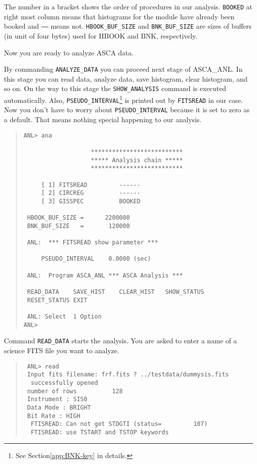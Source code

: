 The number in a bracket shows the order of procedures in our analysis.
{\tt BOOKED} at right most column means
that histograms for the module have already been booked
and {\tt ------} means not.
{\tt HBOOK\_BUF\_SIZE} and {\tt BNK\_BUF\_SIZE} are sizes of buffers
(in unit of four bytes) used for HBOOK and BNK, respectively.

Now you are ready to analyze ASCA data.

By commanding {\tt ANALYZE\_DATA}
you can proceed next stage of ASCA\_ANL.
In this stage
you can read data,
analyze data,
save histogram,
clear histogram,
and so on.
On the way to this stage
the {\tt SHOW\_ANALYSIS} command is executed automatically.
Also,
{\tt PSEUDO\_INTERVAL}\footnote{
See Section\ref{app:BNK-key} in details.
} is printed out by {\tt FITSREAD} in our case.
Now you don't have to worry about {\tt PSEUDO\_INTERVAL}
because it is set to zero as a default.
That means nothing special happening to our analysis.

\begin{quote}\baselineskip 3.2mm\begin{verbatim}
ANL> ana

                   **************************
                   ***** Analysis chain *****
                   **************************

     [ 1] FITSREAD         ------
     [ 2] CIRCREG          ------
     [ 3] GISSPEC          BOOKED

 HBOOK_BUF_SIZE =      2200000
 BNK_BUF_SIZE   =       120000

 ANL:  *** FITSREAD show parameter ***

     PSEUDO_INTERVAL    0.0000 (sec)
 
 ANL:  Program ASCA_ANL *** ASCA Analysis ***
 
 READ_DATA    SAVE_HIST    CLEAR_HIST   SHOW_STATUS 
 RESET_STATUS EXIT        
 
 ANL: Select  1 Option
ANL> 
\end{verbatim}\end{quote}

Command {\tt READ\_DATA} starts the analysis.
You are asked to enter a name of a science FITS file
you want to analyze.

\begin{quote}\baselineskip 3.2mm\begin{verbatim}
 ANL> read
 Input fits filename: frf.fits ? ../testdata/dummysis.fits
  successfully opened
 number of rows          128
 Instrument : SIS0
 Data Mode : BRIGHT
 Bit Rate : HIGH
  FTISREAD: Can not get STDGTI (status=         107)
  FTISREAD: use TSTART and TSTOP keywords
\end{verbatim}\end{quote}

